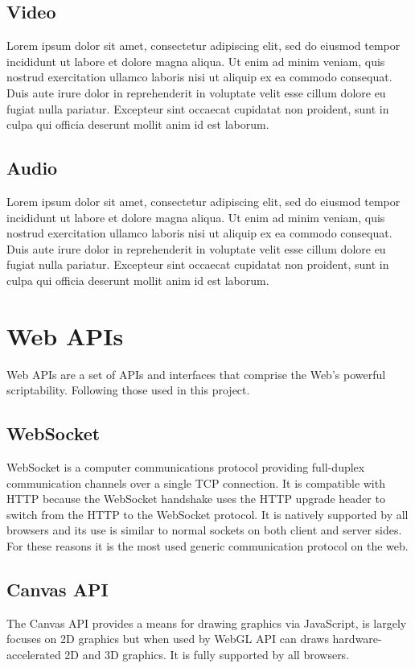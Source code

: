 \subsection{Video}
Lorem ipsum dolor sit amet, consectetur adipiscing elit, sed do eiusmod tempor incididunt ut labore et dolore magna aliqua. Ut enim ad minim veniam, quis nostrud exercitation ullamco laboris nisi ut aliquip ex ea commodo consequat. Duis aute irure dolor in reprehenderit in voluptate velit esse cillum dolore eu fugiat nulla pariatur. Excepteur sint occaecat cupidatat non proident, sunt in culpa qui officia deserunt mollit anim id est laborum.

\subsection{Audio}
Lorem ipsum dolor sit amet, consectetur adipiscing elit, sed do eiusmod tempor incididunt ut labore et dolore magna aliqua. Ut enim ad minim veniam, quis nostrud exercitation ullamco laboris nisi ut aliquip ex ea commodo consequat. Duis aute irure dolor in reprehenderit in voluptate velit esse cillum dolore eu fugiat nulla pariatur. Excepteur sint occaecat cupidatat non proident, sunt in culpa qui officia deserunt mollit anim id est laborum.



\section{Web APIs}
Web APIs are a set of APIs and interfaces that comprise the Web's powerful scriptability. Following those used in this project\cite{Web_APIs}.

\subsection{WebSocket}
WebSocket is a computer communications protocol providing full-duplex communication channels over a single TCP connection. It is compatible with HTTP because the WebSocket handshake uses the HTTP upgrade header to switch from the HTTP to the WebSocket protocol. It is natively supported by all browsers and its use is similar to normal sockets on both client and server sides. For these reasons it is the most used generic communication protocol on the web\cite{WebSocket_Web_APIs}.

\subsection{Canvas API}
The Canvas API provides a means for drawing graphics via JavaScript, is largely focuses on 2D graphics but when used by WebGL API can draws hardware-accelerated 2D and 3D graphics. It is fully supported by all browsers\cite{Canvas_API}.


